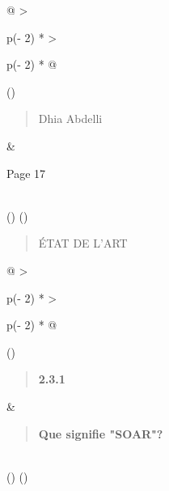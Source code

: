 \documentclass[
]{article}
\begin{document}
\begin{longtable}[]{@{}
  >{\raggedright\arraybackslash}p{(\columnwidth - 2\tabcolsep) * }
  >{\raggedright\arraybackslash}p{(\columnwidth - 2\tabcolsep) * }@{}}
\toprule()
\begin{minipage}[b]{\linewidth}\raggedright
\begin{quote}
Dhia Abdelli
\end{quote}
\end{minipage} & \begin{minipage}[b]{\linewidth}\raggedright
Page 17
\end{minipage} \\
\midrule()
\endhead
\bottomrule()
\end{longtable}

\begin{quote}
ÉTAT DE L'ART
\end{quote}

\begin{longtable}[]{@{}
  >{\raggedright\arraybackslash}p{(\columnwidth - 2\tabcolsep) * }
  >{\raggedright\arraybackslash}p{(\columnwidth - 2\tabcolsep) * }@{}}
\toprule()
\begin{minipage}[b]{\linewidth}\raggedright
\begin{quote}
\textbf{2.3.1}
\end{quote}
\end{minipage} & \begin{minipage}[b]{\linewidth}\raggedright
\begin{quote}
\textbf{Que signifie "SOAR"?}
\end{quote}
\end{minipage} \\
\midrule()
\endhead
\bottomrule()
\end{longtable}
\end{document}
